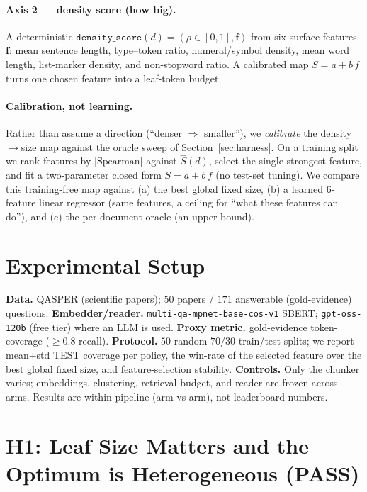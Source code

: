 \documentclass[11pt]{article}
\begin{document}
\paragraph{Axis 2 --- density score (how big).} A deterministic
$\texttt{density\_score}(d) = (\rho \in [0,1], \mathbf{f})$ from six surface
features $\mathbf{f}$: mean sentence length, type--token ratio, numeral/symbol
density, mean word length, list-marker density, and non-stopword ratio. A
calibrated map $S = a + b\,f$ turns one chosen feature into a leaf-token budget.

\paragraph{Calibration, not learning.} Rather than assume a direction (``denser
$\Rightarrow$ smaller''), we \emph{calibrate} the density$\to$size map against the
oracle sweep of Section~\ref{sec:harness}. On a training split we rank features by
$|\text{Spearman}|$ against $\hat S(d)$, select the single strongest feature, and
fit a two-parameter closed form $S = a + b\,f$ (no test-set tuning). We compare
this training-free map against (a) the best global fixed size, (b) a learned
$6$-feature linear regressor (same features, a ceiling for ``what these features
can do''), and (c) the per-document oracle (an upper bound).

\section{Experimental Setup}
\label{sec:setup}

\textbf{Data.} QASPER (scientific papers); $50$ papers / $171$ answerable
(gold-evidence) questions. \textbf{Embedder/reader.}
\texttt{multi-qa-mpnet-base-cos-v1} SBERT; \texttt{gpt-oss-120b} (free tier) where
an LLM is used. \textbf{Proxy metric.} gold-evidence token-coverage
($\ge 0.8$ recall). \textbf{Protocol.} $50$ random $70/30$ train/test splits;
we report mean$\pm$std TEST coverage per policy, the win-rate of the selected
feature over the best global fixed size, and feature-selection stability.
\textbf{Controls.} Only the chunker varies; embeddings, clustering, retrieval
budget, and reader are frozen across arms. Results are within-pipeline
(arm-vs-arm), not leaderboard numbers.

\section{H1: Leaf Size Matters and the Optimum is Heterogeneous (PASS)}
\label{sec:h1}
\end{document}
